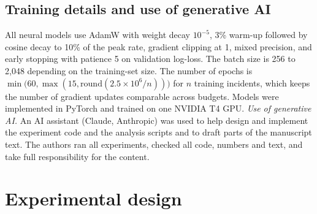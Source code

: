 \documentclass[11pt]{article}
\begin{document}
\subsection{Training details and use of generative AI}
All neural models use AdamW \citep{loshchilov2019} with weight decay $10^{-5}$, 3\% warm-up followed by cosine decay to 10\% of the peak rate, gradient clipping at 1, mixed precision, and early stopping with patience 5 on validation log-loss. The batch size is 256 to 2,048 depending on the training-set size. The number of epochs is $\min\!\big(60, \max(15, \mathrm{round}(2.5\times10^{6}/n))\big)$ for $n$ training incidents, which keeps the number of gradient updates comparable across budgets. Models were implemented in PyTorch \citep{paszke2019} and trained on one NVIDIA T4 GPU. \emph{Use of generative AI.} An AI assistant (Claude, Anthropic) was used to help design and implement the experiment code and the analysis scripts and to draft parts of the manuscript text. The authors ran all experiments, checked all code, numbers and text, and take full responsibility for the content.

\section{Experimental design}\label{sec:design}
\end{document}
